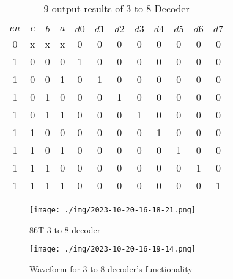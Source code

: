 \documentclass{article}
\begin{document}
\begin{table}[H]
    \centering\large
    \caption{9 output results of 3-to-8 Decoder}
    \begin{tabular}{|c|c|c|c|c|c|c|c|c|c|c|c|}
        \hline
        \textbf{$en$} & \textbf{$c$} &  \textbf{$b$} &  \textbf{$a$} & \textbf{$d0$} &  \textbf{$d1$} &  \textbf{$d2$} &  \textbf{$d3$} &  \textbf{$d4$} &  \textbf{$d5$} &  \textbf{$d6$} &  \textbf{$d7$} \\
        \hline
        0 & x & x & x & 0 & 0 & 0 & 0 & 0 & 0 & 0 & 0\\
        \hline
        1 & 0 & 0 & 0 & 1 & 0 & 0 & 0 & 0 & 0 & 0 & 0\\
        \hline
        1 & 0 & 0 & 1 & 0 & 1 & 0 & 0 & 0 & 0 & 0 & 0\\
        \hline
        1 & 0 & 1 & 0 & 0 & 0 & 1 & 0 & 0 & 0 & 0 & 0\\
        \hline
        1 & 0 & 1 & 1 & 0 & 0 & 0 & 1 & 0 & 0 & 0 & 0\\
        \hline
        1 & 1 & 0 & 0 & 0 & 0 & 0 & 0 & 1 & 0 & 0 & 0\\
        \hline
        1 & 1 & 0 & 1 & 0 & 0 & 0 & 0 & 0 & 1 & 0 & 0\\
        \hline
        1 & 1 & 1 & 0 & 0 & 0 & 0 & 0 & 0 & 0 & 1 & 0\\
        \hline
        1 & 1 & 1 & 1 & 0 & 0 & 0 & 0 & 0 & 0 & 0 & 1\\
        \hline
    \end{tabular}
    \label{decoder}
\end{table}

\begin{figure}[H]
    \centering
    \begin{minipage}[t]{0.7\textwidth}
    \centering
        \texttt{[image: ./img/2023-10-20-16-18-21.png]}
    \caption{86T 3-to-8 decoder}
    \label{decoder1}
    \end{minipage}
    \qquad
    \begin{minipage}[t]{1\textwidth}
    \centering
        \texttt{[image: ./img/2023-10-20-16-19-14.png]}
    \caption{Waveform for 3-to-8 decoder's functionality}
    \label{decoder2}
    \end{minipage}
\end{figure}
\end{document}
